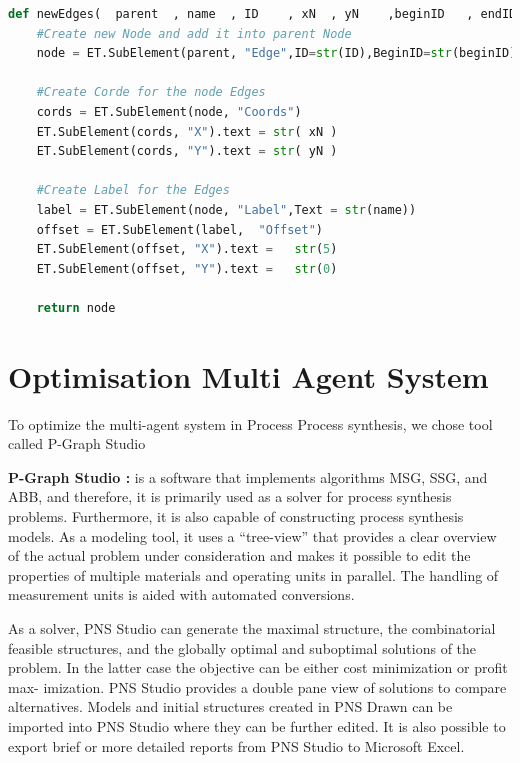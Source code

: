 \begin{lstlisting}[language=Python, caption=Python Function new Edges]
def newEdges(  parent  , name  , ID    , xN  , yN    ,beginID   , endID    ):
	#Create new Node and add it into parent Node	
	node = ET.SubElement(parent, "Edge",ID=str(ID),BeginID=str(beginID),EndID=str(endID),Rate=str(name),Title=str(name) , ArrowOnCenter="true" , ArrowPosition="50")  
	
	#Create Corde for the node Edges
	cords = ET.SubElement(node, "Coords")
	ET.SubElement(cords, "X").text = str( xN )
	ET.SubElement(cords, "Y").text = str( yN )
		 		 		  
	#Create Label for the Edges
	label = ET.SubElement(node, "Label",Text = str(name))
	offset = ET.SubElement(label,  "Offset")
	ET.SubElement(offset, "X").text =   str(5)
	ET.SubElement(offset, "Y").text =   str(0)
 
	return node 
\end{lstlisting}


\pagebreak
\section{ Optimisation Multi Agent System }

To optimize the multi-agent system in  Process Process synthesis, we chose tool called  P-Graph Studio 

\textbf{P-Graph Studio : }   is a software that implements algorithms MSG, SSG, and ABB, and therefore, it is primarily
used as a solver for process synthesis problems. Furthermore, it is also capable of constructing process synthesis models.
As a modeling tool, it uses a “tree-view” that provides a clear overview of the actual problem under consideration and makes
it possible to edit the properties of multiple materials and operating units in parallel. The handling of measurement units
is aided with automated conversions. \cite{ ch3-pgraph2 , Sitepgraph}

As a solver, PNS Studio can generate the maximal structure, the combinatorial feasible structures, and the globally optimal
and suboptimal solutions of the problem. In the latter case the objective can be either cost minimization or profit max-
imization. PNS Studio provides a double pane view of solutions to compare alternatives.
Models and initial structures created in PNS Drawn can be imported into PNS Studio where they can be further edited. It
is also possible to export brief or more detailed reports from PNS Studio to Microsoft Excel. \cite{ch3-pgraph}

